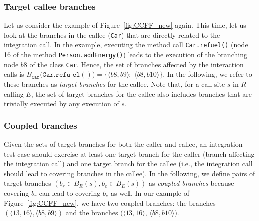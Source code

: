 \subsubsection{Target callee branches}
Let us consider the example of Figure~\ref{fig:CCFF_new}  again. This time, let us look at the branches in the callee (\texttt{Car}) that are directly related to the integration call. In the example, executing the method call  \texttt{Car.refuel()} (node 16 of the method \texttt{Person.addEnergy()}) leads to the execution of the branching node $b8$ of the class \texttt{Car}. Hence, the set of branches affected by the interaction calls is $B_{\mathtt{Car}}(\mathtt{Car.refu}$-$\mathtt{el()}) = \{\langle b8,b9\rangle;$ $\langle b8,b10\rangle\}$. In the following, we refer to these branches as \textit{target branches} for the callee. Note that, for a call site $s$ in $R$ calling $E$, the set of target branches for the callee also  includes branches that are trivially executed by any execution of $s$. 


\subsubsection{Coupled branches}
Given the sets of target branches for both the caller and  callee, an integration test case should exercise at least one target branch for the caller (branch affecting the integration call) and one target branch for the callee (i.e., the integration call should lead to covering branches in the callee). In the following, we define pairs of target branches $(b_r \in B_{R}(s), b_e \in B_{E}(s))$ as \textit{coupled branches} because covering  $b_r$ can lead to covering $b_e$ as well. In our example of Figure~\ref{fig:CCFF_new}, we have two coupled branches: the branches $(\langle 13,16\rangle,\langle b8,b9\rangle)$ and the branches $(\langle 13,16\rangle$, $\langle b8,b10\rangle)$.

